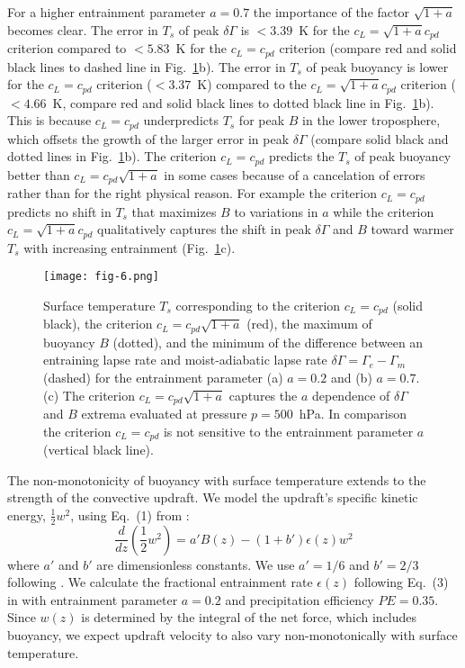 \documentclass[]{ametsocV6.1}
\begin{document}
For a higher entrainment parameter $a=0.7$ the importance of the factor $\sqrt{1+a}$ becomes clear. The error in $T_s$ of peak $\delta \Gamma$ is $<3.39$~K for the $c_L=\sqrt{1+a}c_{pd}$ criterion compared to $<5.83$~K for the $c_L=c_{pd}$ criterion (compare red and solid black lines to dashed line in Fig.~\ref{fig:fig-6}b). The error in $T_s$ of peak buoyancy is lower for the $c_L=c_{pd}$ criterion ($<3.37$~K) compared to the $c_L=\sqrt{1+a}c_{pd}$ criterion ($<4.66$~K, compare red and solid black lines to dotted black line in Fig.~\ref{fig:fig-6}b). This is because $c_L=c_{pd}$ underpredicts $T_s$ for peak $B$ in the lower troposphere, which offsets the growth of the larger error in peak $\delta \Gamma$ (compare solid black and dotted lines in Fig.~\ref{fig:fig-6}b). The criterion $c_L=c_{pd}$ predicts the $T_s$ of peak buoyancy better than $c_L=c_{pd}\sqrt{1+a}$ in some cases because of a cancelation of errors rather than for the right physical reason. For example the criterion $c_L=c_{pd}$ predicts no shift in $T_s$ that maximizes $B$ to variations in $a$ while the criterion $c_L=\sqrt{1+a}c_{pd}$ qualitatively captures the shift in peak $\delta \Gamma$ and $B$ toward warmer $T_s$ with increasing entrainment (Fig.~\ref{fig:fig-6}c).

\begin{figure}[htbp]
 \centering
 \texttt{[image: fig-6.png]}\\
 \caption{Surface temperature $T_s$ corresponding to the criterion $c_L=c_{pd}$ (solid black), the criterion $c_L=c_{pd}\sqrt{1+a}$ (red), the maximum of buoyancy $B$ (dotted), and the minimum of the difference between an entraining lapse rate and moist-adiabatic lapse rate $\delta \Gamma = \Gamma_e - \Gamma_m$ (dashed) for the entrainment parameter (a) $a=0.2$ and (b) $a=0.7$. (c) The criterion $c_L=c_{pd}\sqrt{1+a}$ captures the $a$ dependence of $\delta \Gamma$ and $B$ extrema evaluated at pressure $p=500$~hPa. In comparison the criterion $c_L=c_{pd}$ is not sensitive to the entrainment parameter $a$ (vertical black line).}\label{fig:fig-6}
\end{figure}

The non-monotonicity of buoyancy with surface temperature extends to the strength of the convective updraft. We model the updraft's specific kinetic energy, $\frac{1}{2}w^2$, using Eq.~(1) from \cite{delgenio2007}:
\begin{equation}
\frac{d}{dz}\left(\frac{1}{2}w^2\right)=a'B(z)-(1+b')\epsilon(z)w^2 \label{eq:momentum}
\end{equation}
where $a'$ and $b'$ are dimensionless constants. We use $a'=1/6$ and $b'=2/3$ following \cite{delgenio2007}. We calculate the fractional entrainment rate $\epsilon(z)$ following Eq.~(3) in \cite{romps2016} with entrainment parameter $a=0.2$ and precipitation efficiency $PE=0.35$. Since $w(z)$ is determined by the integral of the net force, which includes buoyancy, we expect updraft velocity to also vary non-monotonically with surface temperature.
\end{document}
